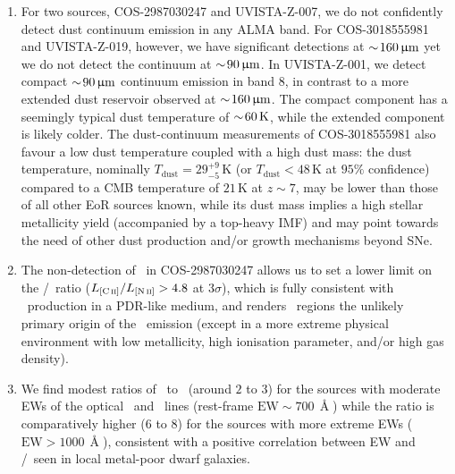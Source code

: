 \begin{enumerate}[label=(\roman*)]
    \item For two sources, COS-2987030247 and UVISTA-Z-007, we do not confidently detect dust continuum emission in any ALMA band. For COS-3018555981 and UVISTA-Z-019, however, we have significant detections at $\sim \! 160 \, \mathrm{\upmu m}$ yet we do not detect the continuum at $\sim \! 90 \, \mathrm{\upmu m}$. In UVISTA-Z-001, we detect compact $\sim \! 90 \, \mathrm{\upmu m}$ continuum emission in band 8, in contrast to a more extended dust reservoir observed at $\sim \! 160 \, \mathrm{\upmu m}$. The compact component has a seemingly typical dust temperature of $\sim \! 60 \, \mathrm{K}$, while the extended component is likely colder. The dust-continuum measurements of COS-3018555981 also favour a low dust temperature coupled with a high dust mass: the dust temperature, nominally $T_\text{dust} = 29_{-5}^{+9} \, \mathrm{K}$ (or $T_\text{dust} < 48 \, \mathrm{K}$ at $95 \%$ confidence) compared to a CMB temperature of $21 \, \mathrm{K}$ at $z \sim 7$, may be lower than those of all other EoR sources known, while its dust mass implies a high stellar metallicity yield (accompanied by a top-heavy IMF) and may point towards the need of other dust production and/or growth mechanisms beyond SNe.
    
    \item The non-detection of \NIILam\ in COS-2987030247 allows us to set a lower limit on the \CII/\NII\ ratio ($L_\CII/L_\NII > 4.8$ at $3 \sigma$), which is fully consistent with \CII\ production in a PDR-like medium, and renders \HII\ regions the unlikely primary origin of the \CII\ emission (except in a more extreme physical environment with low metallicity, high ionisation parameter, and/or high gas density).
    
    \item We find modest ratios of \OIIILam\ to \CIILam\ (around $2$ to $3$) for the sources with moderate EWs of the optical \OIIIf\ and \Hbeta\ lines (rest-frame $\text{EW} \sim 700 \, \Angstrom$) while the ratio is comparatively higher ($6$ to $8$) for the sources with more extreme EWs ($\text{EW} > \num{1000} \, \Angstrom$), consistent with a positive correlation between EW and \OIIIf/\CII\ seen in local metal-poor dwarf galaxies.
    

\end{enumerate}
